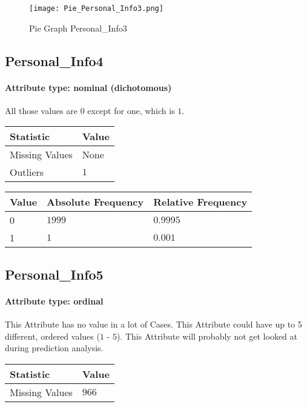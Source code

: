 \begin{figure}[H]
	\begin{center}
		\texttt{[image: Pie\_Personal\_Info3.png]}
	\end{center}
	\caption{Pie Graph Personal\_Info3}
\end{figure}

\subsection{Personal\_Info4}
\paragraph{Attribute type: nominal (dichotomous)} \quad All those values are $0$ except for one, which is $1$.

\begin{table}[H]
	\renewcommand{\arraystretch}{1.25}
	\begin{tabular}{l|l}
		\textbf{Statistic} & \textbf{Value}\\\hline
		Missing Values& None\\\hline
		Outliers & $1$
	\end{tabular}
\end{table}
\begin{table}[H]
	\renewcommand{\arraystretch}{1.25}
	\begin{tabular}{l|l|l}
		\textbf{Value} & \textbf{Absolute Frequency} & \textbf{Relative Frequency}\\\hline
		0&$1999$&$0.9995$\\\hline
		1&$1$&$0.001$
	\end{tabular}
\end{table}


\subsection{Personal\_Info5}
\paragraph{Attribute type: ordinal}This Attribute has no value in a lot of Cases. This Attribute could have up to 5 different, ordered values ($1$ - $5$). This Attribute will probably not get looked at during prediction analysis.

\begin{table}[H]
	\renewcommand{\arraystretch}{1.25}
	\begin{tabular}{l|l}
		\textbf{Statistic} & \textbf{Value}\\\hline
		Missing Values& $966$\\\hline
	\end{tabular}
\end{table}

